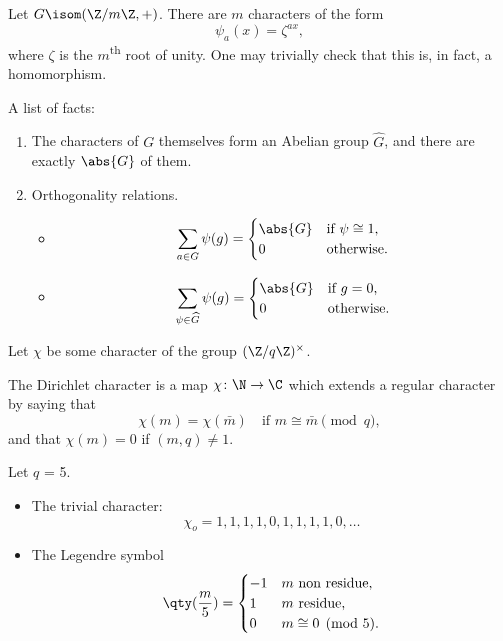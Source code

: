 \begin{example}
	Let $G \isom (\Z/m\Z, +)$.
	There are $m$ characters of the form 
	\[ \psi_a(x) = \zeta^{ax}, \]
	where $\zeta$ is the $m$\textsuperscript{th} root of unity.
	One may trivially check that this is, in fact, a homomorphism.
\end{example}

A list of facts:

\begin{enumerate}
	\item The characters of $G$ themselves form an Abelian group $\widehat{G}$, 
	and there are exactly $\abs{G}$ of them.
	\item Orthogonality relations.
	\begin{itemize}
		\item \[ \sum_{a \in G} \psi(g) = \begin{cases}
			\abs{G} & \text{if $\psi \cong 1$,} \\
			0 & \text{otherwise}.
		\end{cases} \]
		\item \[ \sum_{\psi \in \widehat{G}} \psi(g) = \begin{cases}
			\abs{G} & \text{if $g = 0$,} \\
			0 & \text{otherwise}.
		\end{cases} \]
	\end{itemize}
\end{enumerate}

Let $\chi$ be some character of the group $(\Z/q\Z)^\times$.

\begin{definition}
	The Dirichlet character is a map $\chi\colon \N \to \C$ which extends
	a regular character by saying that
	\[ \chi(m) = \chi(\bar{m}) \quad \text{if $m \cong \bar{m} \pmod{q}$}, \]
	and that $\chi(m) = 0$ if $(m,q) \not= 1$.
\end{definition}

\begin{example} Let $q$ = 5.
	\begin{itemize}
		\item The trivial character: 
		\[ \chi_o = 1,1,1,1,0,1,1,1,1,0,\dotsc \]
		\item The Legendre symbol
		\[ \qty(\frac{m}{5}) = \begin{cases}
			-1 & \text{$m$ non residue,} \\
			1 & \text{$m$ residue,} \\
			0 & \text{$m \cong 0 \pmod{5}$.}
		\end{cases} \]
	\end{itemize}
\end{example}

